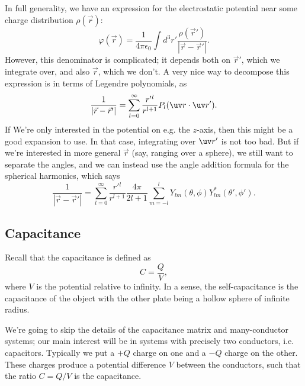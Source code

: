 In full generality, we have an expression for the electrostatic potential near some charge distribution $\rho(\vec r)$:
\begin{equation}
    \varphi(\vec r)  =\frac{1}{4\pi \epsilon_0} \int d^3 r' \frac{\rho(\vec r')}{|\vec r- \vec r'|}.
\end{equation}
However, this denominator is complicated; it depends both on $\vec r'$, which we integrate over, and also $\vec r$, which we don't. A very nice way to decompose this expression is in terms of Legendre polynomials, as
\begin{equation}
    \frac{1}{|\vec r - \vec r'|} = \sum_{l=0}^\infty \frac{r'{}^l}{r^{l+1}} P_l(\uv r \cdot \uv r').
\end{equation}
If We're only interested in the potential on e.g. the $z$-axis, then this might be a good expansion to use. In that case, integrating over $\uv r'$ is not too bad. But if we're interested in more general $\vec r$ (say, ranging over a sphere), we still want to separate the angles, and we can instead use the angle addition formula for the spherical harmonics, which says
\begin{equation}
    \frac{1}{|\vec r - \vec r'|} = \sum_{l=0}^\infty \frac{r'{}^l}{r^{l+1}} \frac{4\pi}{2l+1} \sum_{m=-l}^l Y_{lm}(\theta, \phi) Y_{lm}^*(\theta',\phi').
\end{equation}

\subsection*{Capacitance}
Recall that the capacitance is defined as
\begin{equation}
    C= \frac{Q}{V},
\end{equation}
where $V$ is the potential relative to infinity. In a sense, the self-capacitance is the capacitance of the object with the other plate being a hollow sphere of infinite radius.

We're going to skip the details of the capacitance matrix and many-conductor systems; our main interest will be in systems with precisely two conductors, i.e. capacitors. Typically we put a $+Q$ charge on one and a $-Q$ charge on the other. These charges produce a potential difference $V$ between the conductors, such that the ratio $C=Q/V$ is the capacitance.

